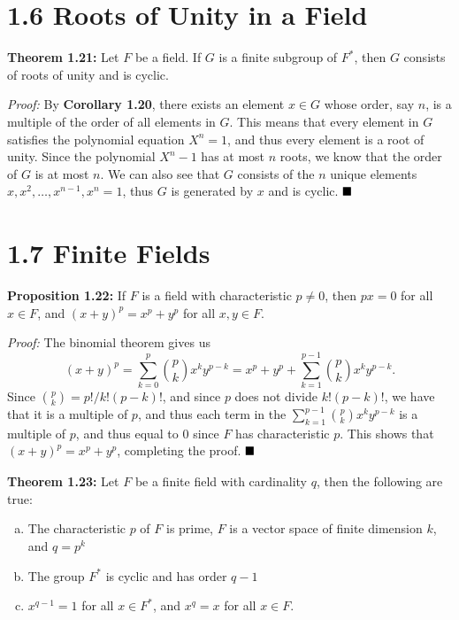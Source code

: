 \documentclass[12pt]{article}
\newcommand{\proof}{\textit{Proof: }}
\newcommand{\done}{\ensuremath{\strut\hfill\blacksquare}}
\begin{document}
\section*{1.6 Roots of Unity in a Field}

\textbf{Theorem 1.21:}
Let \( F \) be a field.
If \( G \) is a finite subgroup of \( F^* \), then \( G \) consists of roots of
unity and is cyclic.

\proof
By \textbf{Corollary 1.20}, there exists an element \( x \in G \) whose order,
say \( n \), is a multiple of the order of all elements in \( G \).
This means that every element in \( G \) satisfies the polynomial equation
\( X^n = 1 \), and thus every element is a root of unity.
Since the polynomial \( X^n - 1 \) has at most \( n \) roots, we know
that the order of \( G \) is at most \( n \).
We can also see that \( G \) consists of the \( n \) unique elements
\( x, x^2, \dots, x^{n - 1}, x^n = 1 \), thus \( G \) is generated by
\( x \) and is cyclic.
\done

\section*{1.7 Finite Fields}

\textbf{Proposition 1.22:}
If \( F \) is a field with characteristic \( p \ne 0 \), then \( px = 0 \) for
all \( x \in F \), and \( (x + y)^p = x^p + y^p \) for all \( x, y \in F \).

\proof
The binomial theorem gives us
\[
	(x + y)^p
	= \sum_{k = 0}^p \binom{p}{k} x^ky^{p - k}
	= x^p + y^p + \sum_{k = 1}^{p - 1} \binom{p}{k} x^ky^{p - k}.
\]
Since \( \binom{p}{k} = p!/k!(p - k)! \), and since \( p \) does not divide
\( k!(p - k)! \), we have that it is a multiple of \( p \), and thus each
term in the \( \sum_{k = 1}^{p - 1} \binom{p}{k} x^ky^{p - k} \) is a multiple
of \( p \), and thus equal to 0 since \( F \) has characteristic \( p \).
This shows that \( (x + y)^p = x^p + y^p \), completing the proof.
\done

\textbf{Theorem 1.23:}
Let \( F \) be a finite field with cardinality \( q \), then the following are
true:
\begin{enumerate}[(a)]
	\item The characteristic \( p \) of \( F \) is prime, \( F \) is a vector
	      space of finite dimension \( k \), and \( q = p^k \)

	\item The group \( F^* \) is cyclic and has order \( q - 1 \)

	\item \( x^{q - 1} = 1 \) for all \( x \in F^* \), and \( x^q = x \) for
	      all \( x \in F \).
\end{enumerate}
\end{document}
